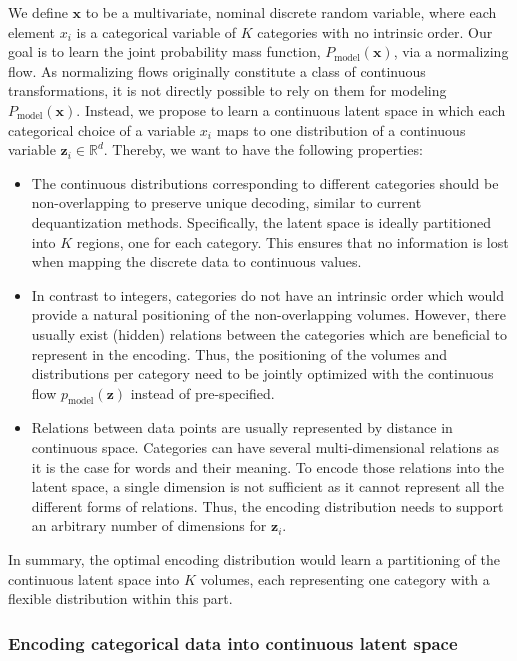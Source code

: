 We define $\bm{x}$ to be a multivariate, nominal discrete random variable, where each element $x_i$ is a categorical variable of $K$ categories with no intrinsic order.
Our goal is to learn the joint probability mass function, $P_{\text{model}}(\bm{x})$, via a normalizing flow.
As normalizing flows originally constitute a class of continuous transformations, it is not directly possible to rely on them for modeling $P_{\text{model}}(\bm{x})$. Instead, we propose to learn a continuous latent space 
in which each categorical choice of a variable $x_i$ maps to one distribution of a continuous variable $\bm{z}_i \in \mathbb{R}^{d}$. 
Thereby, we want to have the following properties:
\begin{itemize}
	\item The continuous distributions corresponding to different categories should be non-overlapping to preserve unique decoding, similar to current dequantization methods. Specifically, the latent space is ideally partitioned into $K$ regions, one for each category. This ensures that no information is lost when mapping the discrete data to continuous values.
	\item In contrast to integers, categories do not have an intrinsic order which would provide a natural positioning of the non-overlapping volumes.
	However, there usually exist (hidden) relations between the categories which are beneficial to represent in the encoding.
	Thus, the positioning of the volumes and distributions per category need to be jointly optimized with the continuous flow $p_{\text{model}}(\bm{z})$ instead of pre-specified.
	\item Relations between data points are usually represented by distance in continuous space. Categories can have several multi-dimensional relations as it is the case for words and their meaning. To encode those relations into the latent space, a single dimension is not sufficient as it cannot represent all the different forms of relations. Thus, the encoding distribution needs to support an arbitrary number of dimensions for $\bm{z}_i$.
\end{itemize}
In summary, the optimal encoding distribution would learn a partitioning of the continuous latent space into $K$ volumes, each representing one category with a flexible distribution within this part.

\subsubsection{Encoding categorical data into continuous latent space}

